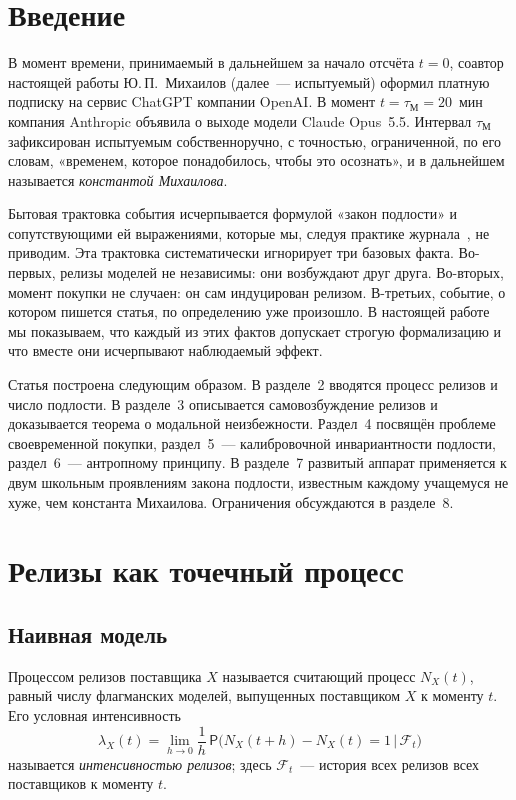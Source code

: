 \documentclass[11pt,a4paper]{article}
\newcommand{\tM}{\tau_{\mathrm{М}}}
\begin{document}
\section{Введение}

В момент времени, принимаемый в дальнейшем за начало отсчёта $t=0$, соавтор настоящей работы Ю.\,П.~Михаилов (далее~--- испытуемый) оформил платную подписку на сервис ChatGPT компании OpenAI. В момент $t = \tM = 20$~мин компания Anthropic объявила о выходе модели Claude Opus~5.5. Интервал $\tM$ зафиксирован испытуемым собственноручно, с точностью, ограниченной, по его словам, «временем, которое понадобилось, чтобы это осознать», и в дальнейшем называется \emph{константой Михаилова}.

Бытовая трактовка события исчерпывается формулой «закон подлости» и сопутствующими ей выражениями, которые мы, следуя практике журнала~\cite{podl}, не приводим. Эта трактовка систематически игнорирует три базовых факта. Во-первых, релизы моделей не независимы: они возбуждают друг друга. Во-вторых, момент покупки не случаен: он сам индуцирован релизом. В-третьих, событие, о котором пишется статья, по определению уже произошло. В настоящей работе мы показываем, что каждый из этих фактов допускает строгую формализацию и что вместе они исчерпывают наблюдаемый эффект.

Статья построена следующим образом. В разделе~2 вводятся процесс релизов и число подлости. В разделе~3 описывается самовозбуждение релизов и доказывается теорема о модальной неизбежности. Раздел~4 посвящён проблеме своевременной покупки, раздел~5~--- калибровочной инвариантности подлости, раздел~6~--- антропному принципу. В разделе~7 развитый аппарат применяется к двум школьным проявлениям закона подлости, известным каждому учащемуся не хуже, чем константа Михаилова. Ограничения обсуждаются в разделе~8.

\section{Релизы как точечный процесс}

\subsection{Наивная модель}

\begin{definition}
Процессом релизов поставщика $X$ называется считающий процесс $N_X(t)$, равный числу флагманских моделей, выпущенных поставщиком $X$ к моменту $t$. Его условная интенсивность
\[
\lambda_X(t) = \lim_{h\to 0}\frac{1}{h}\,\mathsf{P}\bigl(N_X(t+h)-N_X(t)=1 \,\big|\, \mathcal{F}_t\bigr)
\]
называется \emph{интенсивностью релизов}; здесь $\mathcal{F}_t$~--- история всех релизов всех поставщиков к моменту $t$.
\end{definition}
\end{document}
